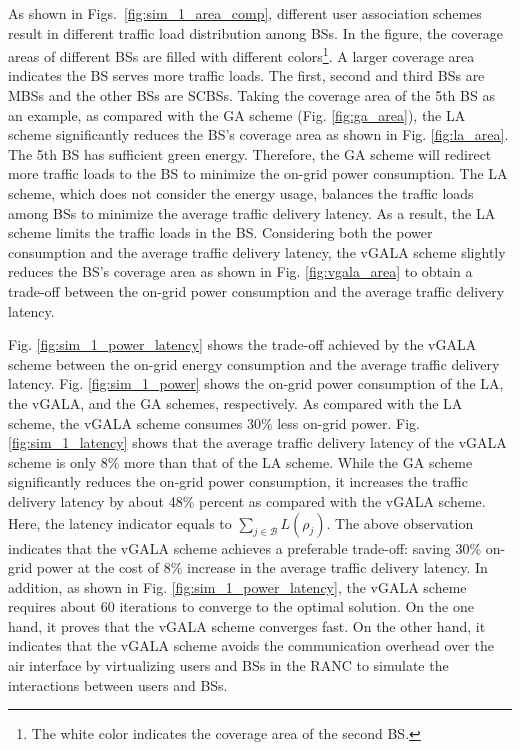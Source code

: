 \documentclass[journal]{IEEEtran}
\theoremstyle{definition}
\begin{document}
As shown in Figs.~\ref{fig:sim_1_area_comp}, different user association schemes result in different traffic load distribution among BSs. In the figure, the coverage areas of different BSs are filled with different colors\footnote{The white color indicates the coverage area of the second BS.}. A larger coverage area indicates the BS serves more traffic loads. The first, second and third BSs are MBSs and the other BSs are SCBSs. Taking the coverage area of the 5th BS as an example, as compared with the GA scheme (Fig. \ref{fig:ga_area}), the LA scheme significantly reduces the BS's coverage area as shown in Fig. \ref{fig:la_area}. The 5th BS has sufficient green energy. Therefore, the GA scheme will redirect more traffic loads to the BS to minimize the on-grid power consumption. The LA scheme, which does not consider the energy usage, balances the traffic loads among BSs to minimize the average traffic delivery latency. As a result, the LA scheme limits the traffic loads in the BS. Considering both the power consumption and the average traffic delivery latency, the vGALA scheme slightly reduces the BS's coverage area as shown in Fig. \ref{fig:vgala_area} to obtain a trade-off between the on-grid power consumption and the average traffic delivery latency.

Fig. \ref{fig:sim_1_power_latency} shows the trade-off achieved by the vGALA scheme between the on-grid energy consumption and the average traffic delivery latency. Fig. \ref{fig:sim_1_power} shows the on-grid power consumption of the LA, the vGALA, and the GA schemes, respectively. As compared with the LA scheme, the vGALA scheme consumes 30\% less on-grid power. Fig. \ref{fig:sim_1_latency} shows that the average traffic delivery latency of the vGALA scheme is only 8\% more than that of the LA scheme. While the GA scheme significantly reduces the on-grid power consumption, it increases the traffic delivery latency by about 48\% percent as compared with the vGALA scheme. Here, the latency indicator equals to $\sum_{j \in \mathcal{B}}L(\rho_{j})$. The above observation indicates that the vGALA scheme achieves a preferable trade-off: saving 30\% on-grid power at the cost of 8\% increase in the average traffic delivery latency. In addition, as shown in Fig. \ref{fig:sim_1_power_latency}, the vGALA scheme requires about 60 iterations to converge to the optimal solution. On the one hand, it proves that the vGALA scheme converges fast. On the other hand, it indicates that the vGALA scheme avoids the communication overhead over the air interface by virtualizing users and BSs in the RANC to simulate the interactions between users and BSs.
\end{document}
